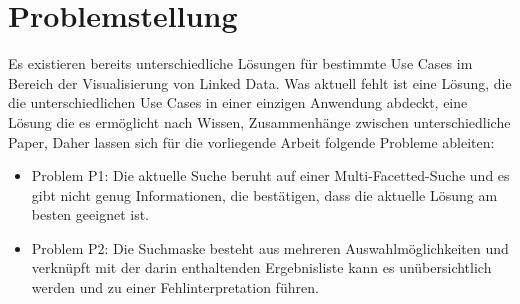 \section{Problemstellung}\label{sec:problemstellung}

Es existieren bereits unterschiedliche Lösungen für bestimmte Use Cases im Bereich der Visualisierung von Linked Data. Was aktuell fehlt ist eine Lösung, die die unterschiedlichen Use Cases in einer einzigen Anwendung abdeckt, eine Lösung die es ermöglicht nach Wissen, Zusammenhänge zwischen unterschiedliche Paper,  Daher lassen sich für die vorliegende Arbeit folgende Probleme ableiten:

\begin{itemize}
\item Problem P1: Die aktuelle Suche beruht auf einer Multi-Facetted-Suche und es gibt nicht genug Informationen, die bestätigen, dass die aktuelle Lösung am besten geeignet ist.
\item Problem P2: Die Suchmaske besteht aus mehreren Auswahlmöglichkeiten und verknüpft mit der darin enthaltenden Ergebnisliste kann es unübersichtlich werden und zu einer Fehlinterpretation führen.
\end{itemize}






